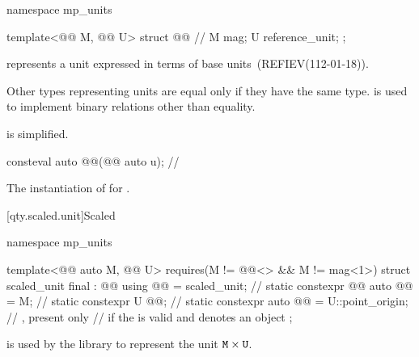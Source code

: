 \begin{codeblock}
namespace mp_units {

template<@@ M, @@ U>
struct @@ {  // \expos
  M mag;
  U reference_unit;
};

}
\end{codeblock}

\pnum
{} represents a unit expressed in terms of base units~(REFIEV(112-01-18)).
\begin{note}
Other types representing units are equal only if they have the same type.
 is used to implement binary relations other than equality.
\end{note}
 is simplified.

\begin{itemdecl}
consteval auto @@(@@ auto u);  // \expos
\end{itemdecl}

\begin{itemdescr}
\pnum
\returns
The instantiation of  for .
\end{itemdescr}

[qty.scaled.unit]{Scaled}

\begin{codeblock}
namespace mp_units {

template<@@ auto M, @@ U>
  requires(M != @@<>{} && M != mag<1>)
struct scaled_unit final : @@ {
  using @@ = scaled_unit;                         // \expos
  static constexpr @@ auto @@ = M;           // \expos
  static constexpr U @@{};                   // \expos
  static constexpr auto @@ = U::point_origin;  // \expos, present only
    // if the   is valid and denotes an object
};

}
\end{codeblock}

\pnum
{} is used by the library
to represent the unit $\texttt{\protect M} \times \texttt{\protect U}$.

